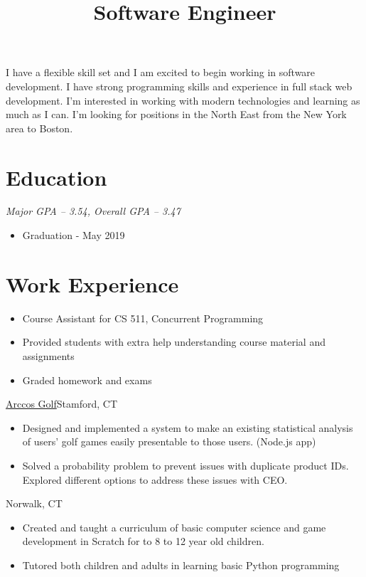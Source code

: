 \documentclass[11pt,letterpaper,roman]{moderncv}
\title{Software Engineer}
\begin{document}
\makecvtitle
\vspace*{-5mm}


{
    I have a flexible skill set and I am excited to begin working in software development.
    I have strong programming skills and experience in full stack web development. 
    I'm interested in working with modern technologies and learning as much as I can. 
    I'm looking for positions in the North East from the New York area to Boston.
}

\section{Education}
{
    \textit{Major GPA -- 3.54, Overall GPA -- 3.47}
    \begin{itemize}
        \item Graduation - May 2019
    \end{itemize}
}

\section{Work Experience}
{
    \begin{itemize}
        \item Course Assistant for CS 511, Concurrent Programming
        \item Provided students with extra help understanding course material and assignments
        \item Graded homework and exams
    \end{itemize}
}
{\href{http://www.arccosgolf.com/}{Arccos Golf}}{Stamford, CT}{}
{
    \begin{itemize}
        \item Designed and implemented a system to make an existing statistical analysis of users'
              golf games easily presentable to those users. (Node.js app)
        \item Solved a probability problem to prevent issues with duplicate product IDs.
              Explored different options to address these issues with CEO.
    \end{itemize}
}
{Norwalk, CT}{}
{
    \begin{itemize}
        \item Created and taught a curriculum of basic computer science and game development in
              Scratch for to 8 to 12 year old children.
        \item Tutored both children and adults in learning basic Python programming
    \end{itemize}
}
\end{document}

